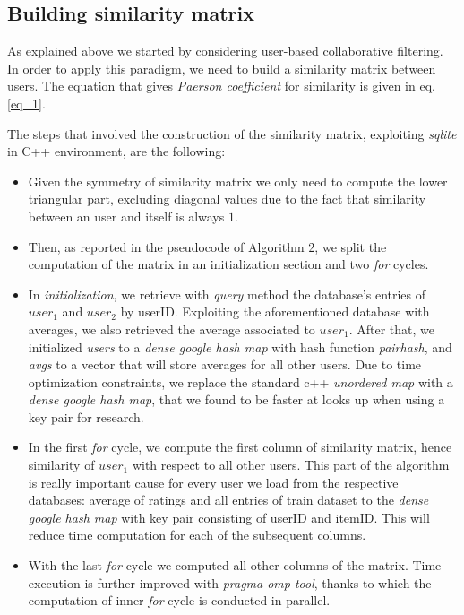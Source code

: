 \subsection{Building similarity matrix}

As explained above we started by considering user-based collaborative filtering. In order to apply this paradigm, we need to build a similarity matrix between users. The equation that gives \textit{Paerson coefficient} for similarity is given in eq. \ref{eq_1}.

The steps that involved the construction of the similarity matrix, exploiting \textit{sqlite} in C++ environment, are the following:

\begin{itemize}
	\item Given the symmetry of similarity matrix we only need to compute the lower triangular part, excluding diagonal values due to the fact that similarity between an user and itself is always $1$. 
	\item Then, as reported in the pseudocode of Algorithm 2, we split the computation of the matrix in an initialization section and two \textit{for} cycles.
	\item In \textit{initialization}, we retrieve with \textit{query} method the database's entries of $user_1$ and $user_2$ by userID. Exploiting the aforementioned database with averages, we also retrieved the average associated to $user_1$. After that, we initialized \textit{users} to a \textit{dense google hash map} with hash function \textit{pairhash}, and \textit{avgs} to a vector that will store averages for all other users.
	Due to time optimization constraints, we replace the standard c++ \textit{unordered map} with a \textit{dense google hash map}, that we found to be faster at looks up when using a key pair for research.
	\item In the first \textit{for} cycle, we compute the first column of similarity matrix, hence similarity of $user_1$ with respect to all other users. This part of the algorithm is really important cause for every user we load from the respective databases: average of ratings and all entries of train dataset to the \textit{dense google hash map} with key pair consisting of userID and itemID. This will reduce time computation for each of the subsequent columns.
	\item With the last \textit{for} cycle we computed all other columns of the matrix. Time execution is further improved with \textit{pragma omp tool}, thanks to which the computation of inner \textit{for} cycle is conducted in parallel.

\end{itemize}
